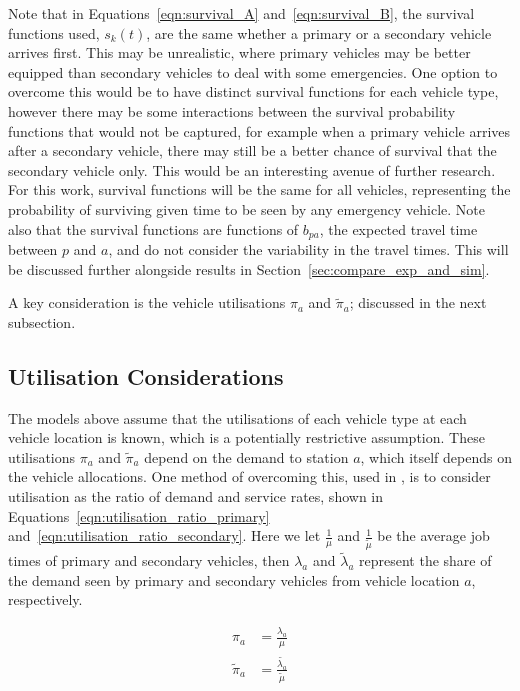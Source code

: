 \documentclass[numbers,webpdf,imaman]{ima-authoring-template}%
\begin{document}
Note that in Equations~\ref{eqn:survival_A}
and~\ref{eqn:survival_B}, the survival functions used, $s_k(t)$, are the same
whether a primary or a secondary vehicle arrives first. This may be unrealistic,
where primary vehicles may be better equipped than secondary vehicles to deal
with some emergencies. One option to overcome this would be to have distinct
survival functions for each vehicle type, however there may be some interactions
between the survival probability functions that would not be captured, for
example when a primary vehicle arrives after a secondary vehicle, there may
still be a better chance of survival that the secondary vehicle only. This would
be an interesting avenue of further research. For this work, survival functions
will be the same for all vehicles, representing the probability of surviving
given time to be seen by any emergency vehicle.
Note also that the survival functions are functions of $b_{pa}$, the expected
travel time between $p$ and $a$, and do not consider the variability in the
travel times. This will be discussed further alongside results in
Section~\ref{sec:compare_exp_and_sim}.


A key consideration is the vehicle utilisations $\pi_a$ and $\tilde{\pi}_a$;
discussed in the next subsection.

\subsection{Utilisation Considerations}\label{sec:utilisation}
The models above assume that the utilisations of each vehicle type at each
vehicle location is known, which is a potentially restrictive assumption.
These utilisations $\pi_a$ and $\tilde{\pi}_a$ depend on the demand to station
$a$, which itself depends on the vehicle allocations. One method of overcoming
this, used in \citet{Knight2012918}, is to consider utilisation as the ratio of
demand and service rates, shown in Equations~\ref{eqn:utilisation_ratio_primary}
and~\ref{eqn:utilisation_ratio_secondary}. Here we let $\frac{1}{\mu}$ and
$\frac{1}{\tilde{\mu}}$ be the average job times of primary and secondary
vehicles, then $\lambda_a$ and $\tilde{\lambda}_a$ represent the share of the
demand seen by primary and secondary vehicles from vehicle location $a$,
respectively.

\begin{align}
\pi_a &= \frac{\lambda_a}{\mu} \label{eqn:utilisation_ratio_primary}\\
\tilde{\pi}_a &= \frac{\tilde{\lambda_a}}{\tilde{\mu}} \label{eqn:utilisation_ratio_secondary}
\end{align}
\end{document}
